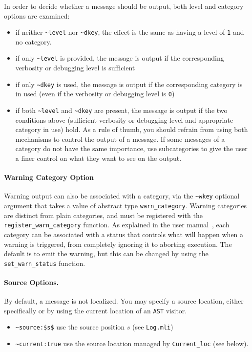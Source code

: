 In order to decide whether a message should be output, both level and category
options are examined:
\begin{itemize}
\item if neither \lstinline|~level| nor \lstinline|~dkey|, the effect is the
  same as having a level of \lstinline|1| and no category.
\item if only \lstinline|~level| is provided, the message is output if the
  corresponding verbosity or debugging level is sufficient
\item if only \lstinline|~dkey| is used, the message is output if the
  corresponding category is in used
  (even if the verbosity or debugging level is \lstinline|0|)
\item if both \lstinline|~level| and \lstinline|~dkey| are present,
  the message is output if the two conditions above
  (sufficient verbosity or debugging level and appropriate category in use)
  hold. As a rule of thumb, you should refrain from using both mechanisms to
  control the output of a message. If some messages of a category do not have
  the same importance, use subcategories to give the user a finer control on
  what they want to see on the output.
\end{itemize}

\paragraph{Warning Category Option} Warning output can also
be associated with a category, via the \lstinline|~wkey| optional argument
that takes a value of abstract type
\lstinline|warn_category|. Warning categories
are distinct from plain categories, and must be registered with the
\lstinline|register_warn_category| function. As explained in the user
manual~\cite{userman}, each category can be associated with a status that
controls what will happen when a warning is triggered, from completely ignoring
it to aborting execution. The default is to emit the warning, but this can
be changed by using the
\lstinline|set_warn_status| function.

\paragraph{Source Options.} By default, a message is not localized. You may
specify a source location, either specifically or by using the current
location of an \texttt{AST} visitor.
\lstset{style=frama-c-style}
\begin{itemize}
\item[] \lstinline{~source:$s$} use the source position $s$ (see \texttt{Log.mli})
\item[] \lstinline{~current:true} use the source location
  managed by \texttt{Current\_loc} (see below).
\end{itemize}

